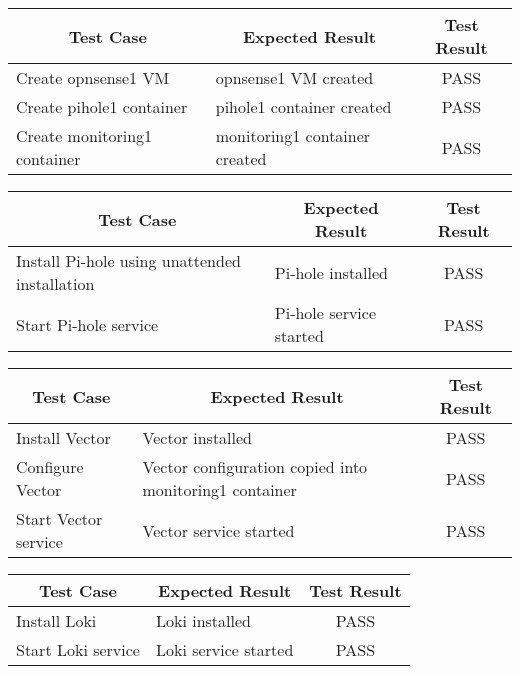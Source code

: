 \documentclass[../index.tex]{subfiles}
\begin{document}
\begin{center}
  \begin{tabular}{|l|l|c|} 
    \hline
    \multicolumn{1}{|c|}{Test Case} & \multicolumn{1}{c|}{Expected Result} & \multicolumn{1}{c|}{Test Result} \\
    \hline
    Create opnsense1 VM             & opnsense1 VM created                 & PASS \\ 
    Create pihole1 container        & pihole1 container created            & PASS \\ 
    Create monitoring1 container    & monitoring1 container created        & PASS \\ 
    \hline
  \end{tabular}
  \label{table:blackbox_pve}
\end{center}

\begin{center}
  \begin{tabular}{|l|l|c|} 
    \hline
    \multicolumn{1}{|c|}{Test Case} & \multicolumn{1}{c|}{Expected Result} & \multicolumn{1}{c|}{Test Result} \\
    \hline
    Install Pi-hole using unattended installation & Pi-hole installed      & PASS \\ 
    Start Pi-hole service           & Pi-hole service started              & PASS \\ 
    \hline
  \end{tabular}
  \label{table:blackbox_pihole}
\end{center}

\begin{center}
  \begin{tabular}{|l|l|c|} 
    \hline
    \multicolumn{1}{|c|}{Test Case} & \multicolumn{1}{c|}{Expected Result} & \multicolumn{1}{c|}{Test Result} \\
    \hline
    Install Vector                  & Vector installed                     & PASS \\ 
    Configure Vector                & Vector configuration copied into monitoring1 container & PASS \\
    Start Vector service            & Vector service started               & PASS \\ 
    \hline
  \end{tabular}
  \label{table:blackbox_vector}
\end{center}

\begin{center}
  \begin{tabular}{|l|l|c|} 
    \hline
    \multicolumn{1}{|c|}{Test Case} & \multicolumn{1}{c|}{Expected Result} & \multicolumn{1}{c|}{Test Result} \\
    \hline
    Install Loki                    & Loki installed                       & PASS \\ 
    Start Loki service              & Loki service started                 & PASS \\ 
    \hline
  \end{tabular}
  \label{table:blackbox_loki}
\end{center}
\end{document}
